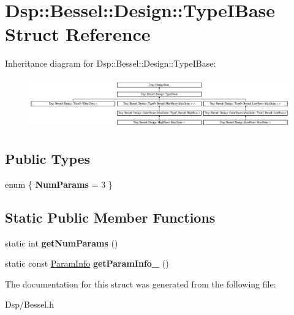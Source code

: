 \hypertarget{structDsp_1_1Bessel_1_1Design_1_1TypeIBase}{\section{Dsp\-:\-:Bessel\-:\-:Design\-:\-:Type\-I\-Base Struct Reference}
\label{structDsp_1_1Bessel_1_1Design_1_1TypeIBase}
}
Inheritance diagram for Dsp\-:\-:Bessel\-:\-:Design\-:\-:Type\-I\-Base\-:\begin{figure}[H]
\begin{center}
\leavevmode
\includegraphics[height=2.196079cm]{structDsp_1_1Bessel_1_1Design_1_1TypeIBase}
\end{center}
\end{figure}
\subsection*{Public Types}
\begin{DoxyCompactItemize}
\item 
enum \{ {\bfseries Num\-Params} =  3
 \}
\end{DoxyCompactItemize}
\subsection*{Static Public Member Functions}
\begin{DoxyCompactItemize}
\item 
\hypertarget{structDsp_1_1Bessel_1_1Design_1_1TypeIBase_a8729c9ca7e9a0f230f04622fa234d789}{static int {\bfseries get\-Num\-Params} ()}\label{structDsp_1_1Bessel_1_1Design_1_1TypeIBase_a8729c9ca7e9a0f230f04622fa234d789}

\item 
\hypertarget{structDsp_1_1Bessel_1_1Design_1_1TypeIBase_ae9b6ebdb24ad1cdcc4f57916886baee7}{static const \hyperlink{classDsp_1_1ParamInfo}{Param\-Info} {\bfseries get\-Param\-Info\-\_} ()}\label{structDsp_1_1Bessel_1_1Design_1_1TypeIBase_ae9b6ebdb24ad1cdcc4f57916886baee7}

\end{DoxyCompactItemize}


The documentation for this struct was generated from the following file\-:\begin{DoxyCompactItemize}
\item 
Dsp/Bessel.\-h\end{DoxyCompactItemize}
